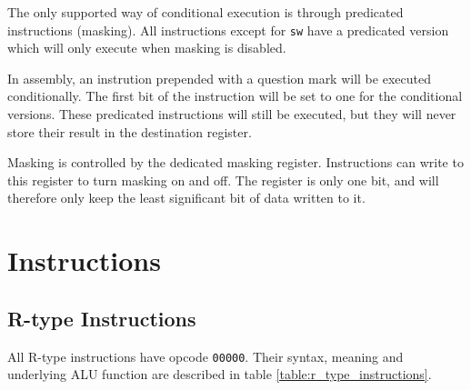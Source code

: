 \documentclass[../main/report.tex]{subfiles}
\begin{document}
The only supported way of conditional execution is through predicated instructions (masking).
All instructions except for \verb/sw/ have a predicated version which will only execute when masking is disabled.

In assembly, an instrution prepended with a question mark will be executed conditionally.
The first bit of the instruction will be set to one for the conditional versions.
These predicated instructions will still be executed, but they will never store their result in the destination register.

Masking is controlled by the dedicated masking register.
Instructions can write to this register to turn masking on and off.
The register is only one bit, and will therefore only keep the least significant bit of data written to it.

\clearpage

\section{Instructions}

\subsection{R-type Instructions}

All R-type instructions have opcode \verb/00000/.
Their syntax, meaning and underlying ALU function are described in table \ref{table:r_type_instructions}.
\end{document}
